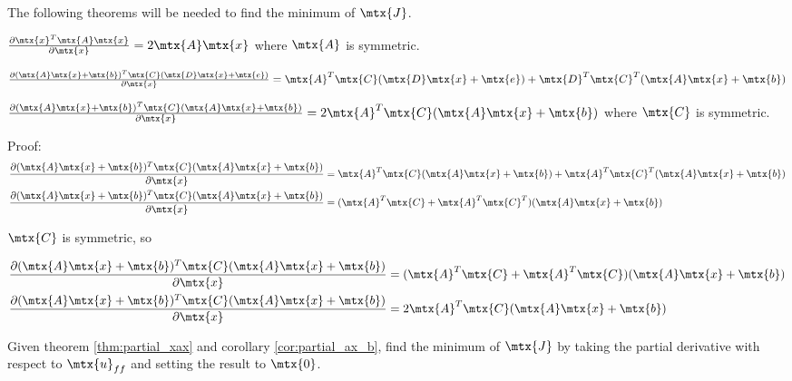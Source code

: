 The following theorems will be needed to find the minimum of $\mtx{J}$.

\begin{theorem}
  \label{thm:partial_xax}

  $\frac{\partial \mtx{x}^T\mtx{A}\mtx{x}}{\partial\mtx{x}} =
    2\mtx{A}\mtx{x}$ where $\mtx{A}$ is symmetric.
\end{theorem}

\begin{theorem}
  \label{thm:partial_ax_b}

  $\frac{\partial (\mtx{A}\mtx{x} + \mtx{b})^T\mtx{C}
    (\mtx{D}\mtx{x} + \mtx{e})}{\partial\mtx{x}} =
    \mtx{A}^T\mtx{C}(\mtx{D}\mtx{x} + \mtx{e}) + \mtx{D}^T\mtx{C}^T
    (\mtx{A}\mtx{x} + \mtx{b})$
\end{theorem}

\begin{corollary}
  \label{cor:partial_ax_b}

  $\frac{\partial (\mtx{A}\mtx{x} + \mtx{b})^T\mtx{C}
    (\mtx{A}\mtx{x} + \mtx{b})}{\partial\mtx{x}} =
    2\mtx{A}^T\mtx{C}(\mtx{A}\mtx{x} + \mtx{b})$ where $\mtx{C}$ is symmetric.

  Proof:
  \begin{align*}
    \frac{\partial (\mtx{A}\mtx{x} + \mtx{b})^T\mtx{C}
      (\mtx{A}\mtx{x} + \mtx{b})}{\partial\mtx{x}} &=
      \mtx{A}^T\mtx{C}(\mtx{A}\mtx{x} + \mtx{b}) + \mtx{A}^T\mtx{C}^T
      (\mtx{A}\mtx{x} + \mtx{b}) \\
    \frac{\partial (\mtx{A}\mtx{x} + \mtx{b})^T\mtx{C}
      (\mtx{A}\mtx{x} + \mtx{b})}{\partial\mtx{x}} &=
      (\mtx{A}^T\mtx{C} + \mtx{A}^T\mtx{C}^T)(\mtx{A}\mtx{x} + \mtx{b})
  \end{align*}

  $\mtx{C}$ is symmetric, so

  \begin{align*}
    \frac{\partial (\mtx{A}\mtx{x} + \mtx{b})^T\mtx{C}
      (\mtx{A}\mtx{x} + \mtx{b})}{\partial\mtx{x}} &=
      (\mtx{A}^T\mtx{C} + \mtx{A}^T\mtx{C})(\mtx{A}\mtx{x} + \mtx{b}) \\
    \frac{\partial (\mtx{A}\mtx{x} + \mtx{b})^T\mtx{C}
      (\mtx{A}\mtx{x} + \mtx{b})}{\partial\mtx{x}} &=
      2\mtx{A}^T\mtx{C}(\mtx{A}\mtx{x} + \mtx{b})
  \end{align*}
\end{corollary}

Given theorem \ref{thm:partial_xax} and corollary \ref{cor:partial_ax_b}, find
the minimum of $\mtx{J}$ by taking the partial derivative with respect to
$\mtx{u}_{ff}$ and setting the result to $\mtx{0}$.

